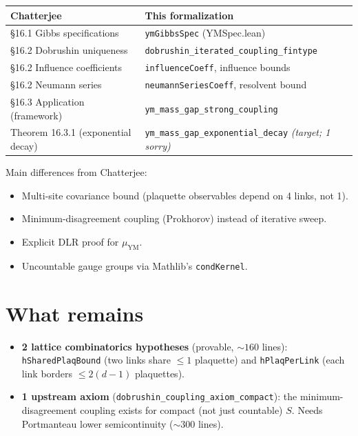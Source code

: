 \documentclass[11pt,a4paper]{article}
\theoremstyle{definition}
\begin{document}
\begin{table}[h]
\centering
\begin{tabular}{ll}
\toprule
Chatterjee & This formalization \\
\midrule
\S16.1 Gibbs specifications &
  \texttt{ymGibbsSpec} (YMSpec.lean) \\
\S16.2 Dobrushin uniqueness &
  \texttt{dobrushin\_iterated\_coupling\_fintype} \\
\S16.2 Influence coefficients &
  \texttt{influenceCoeff}, influence bounds \\
\S16.2 Neumann series &
  \texttt{neumannSeriesCoeff}, resolvent bound \\
\S16.3 Application (framework) &
  \texttt{ym\_mass\_gap\_strong\_coupling} \\
Theorem 16.3.1 (exponential decay) &
  \texttt{ym\_mass\_gap\_exponential\_decay}
  \emph{(target; 1 sorry)} \\
\bottomrule
\end{tabular}
\end{table}

Main differences from Chatterjee:
\begin{itemize}
\item Multi-site covariance bound (plaquette observables depend
  on 4 links, not 1).
\item Minimum-disagreement coupling (Prokhorov) instead of
  iterative sweep.
\item Explicit DLR proof for $\mu_\mathrm{YM}$.
\item Uncountable gauge groups via Mathlib's \texttt{condKernel}.
\end{itemize}

\section{What remains}

\begin{itemize}
\item \textbf{2 lattice combinatorics hypotheses} (provable,
  ${\sim}160$ lines): \texttt{hSharedPlaqBound} (two links share
  $\leq 1$ plaquette) and \texttt{hPlaqPerLink} (each link
  borders $\leq 2(d{-}1)$ plaquettes).
\item \textbf{1 upstream axiom}
  (\texttt{dobrushin\_coupling\_axiom\_compact}): the
  minimum-disagreement coupling exists for compact (not just
  countable) $S$. Needs Portmanteau lower semicontinuity
  (${\sim}300$ lines).
\end{itemize}
\end{document}
